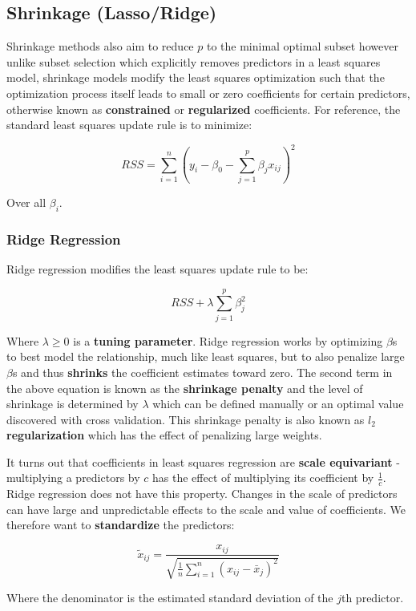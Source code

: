 \subsection{Shrinkage (Lasso/Ridge)}

Shrinkage methods also aim to reduce $p$ to the minimal optimal subset however unlike subset selection which explicitly removes predictors in a least squares model, shrinkage models modify the least squares optimization such that the optimization process itself leads to small or zero coefficients for certain predictors, otherwise known as \textbf{constrained} or \textbf{regularized} coefficients. For reference, the standard least squares update rule is to minimize:

$$ RSS = \sum^{n}_{i=1} (y_{i}-\beta_{0} - \sum^{p}_{j=1}\beta_{j}x_{ij})^{2} $$

Over all $\beta_{i}$.

\subsubsection{Ridge Regression}

Ridge regression modifies the least squares update rule to be:

$$ RSS + \lambda \sum^{p}_{j=1}\beta_{j}^{2} $$

Where $\lambda \ge 0$ is a \textbf{tuning parameter}. Ridge regression works by optimizing $\beta$s to best model the relationship, much like least squares, but to also penalize large $\beta$s and thus \textbf{shrinks} the coefficient estimates toward zero. The second term in the above equation is known as the \textbf{shrinkage penalty} and the level of shrinkage is determined by $\lambda$ which can be defined manually or an optimal value discovered with cross validation. This shrinkage penalty is also known as \textbf{$l_{2}$ regularization} which has the effect of penalizing large weights.

It turns out that coefficients in least squares regression are \textbf{scale equivariant} - multiplying a predictors by $c$ has the effect of multiplying its coefficient by $\frac{1}{c}$. Ridge regression does not have this property. Changes in the scale of predictors can have large and unpredictable effects to the scale and value of coefficients. We therefore want to \textbf{standardize} the predictors:

$$ \widetilde{x}_{ij} = \frac{x_{ij}}{\sqrt{\frac{1}{n}\sum^{n}_{i=1}(x_{ij}-\bar{x}_{j})^{2}}} $$

Where the denominator is the estimated standard deviation of the $j$th predictor.

